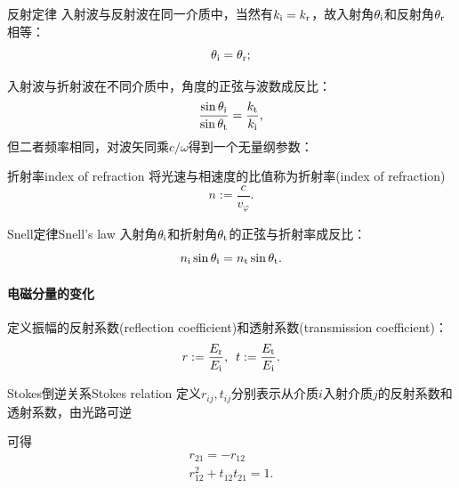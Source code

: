 \begin{theorem}{反射定律}{}
    入射波与反射波在同一介质中，当然有$k_\mathrm i = k_\mathrm r$，故入射角$\theta_\mathrm i$和反射角$\theta_\mathrm r$相等：
    \begin{equation}
        \theta_\mathrm i = \theta_\mathrm r;
    \end{equation}
\end{theorem}
入射波与折射波在不同介质中，角度的正弦与波数成反比：
\[
    \frac{\sin\theta_\mathrm i}{\sin\theta_\mathrm t} = \frac{k_\mathrm t}{k_\mathrm i},
\]
但二者频率相同，对波矢同乘$c/\omega$得到一个无量纲参数：
\begin{definition}
    {折射率}{index of refraction}
    将光速与相速度的比值称为折射率(index of refraction)
    \begin{equation}
        n := \frac c{v_\varphi}.
    \end{equation}
\end{definition}
\begin{theorem}{Snell定律}{Snell's law}
    入射角$\theta_\mathrm i$和折射角$\theta_\mathrm t$的正弦与折射率成反比：
    \begin{equation}
        \label{eqn:Snell}
        n_\mathrm i\sin\theta_\mathrm i = n_\mathrm t\sin\theta_\mathrm t.
    \end{equation}
\end{theorem}

\paragraph{电磁分量的变化}

定义振幅的反射系数(reflection coefficient)和透射系数(transmission coefficient)：
\begin{equation}
    \label{eq:ed-fresnel-amplitudes-definition}
    r := \frac{E_\mathrm r}{E_\mathrm i},\enspace t := \frac{E_\mathrm t}{E_\mathrm i}.
\end{equation}

\begin{theorem}
    {Stokes倒逆关系}{Stokes relation}
    定义$r_{ij},t_{ij}$分别表示从介质$i$入射介质$j$的反射系数和透射系数，由光路可逆
    \begin{notecaptionblock}
    \end{notecaptionblock}
    可得
    \begin{subequations}
        \begin{gather}
            r_{21} = -r_{12}\\
            r_{12}^2 + t_{12}t_{21} = 1.
        \end{gather}
    \end{subequations}
\end{theorem}

